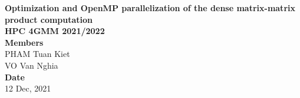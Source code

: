\onehalfspacing


\vspace*{\fill}
\begin{center}
  \LARGE{\textbf{Optimization and OpenMP parallelization of the dense matrix-matrix product computation}}\\
  \Large{\textbf{HPC 4GMM 2021/2022}}\\
  \vspace*{1\baselineskip}
  \Large{\textbf{Members}}\\
  PHAM Tuan Kiet\\
  VO Van Nghia\\
  \vfill %
  \vspace*{\fill}
  \Large{\textbf{Date}}\\
  12 Dec, 2021
\end{center}

\newpage

\newpage
{}
\tableofcontents
{}

\newpage
{}
